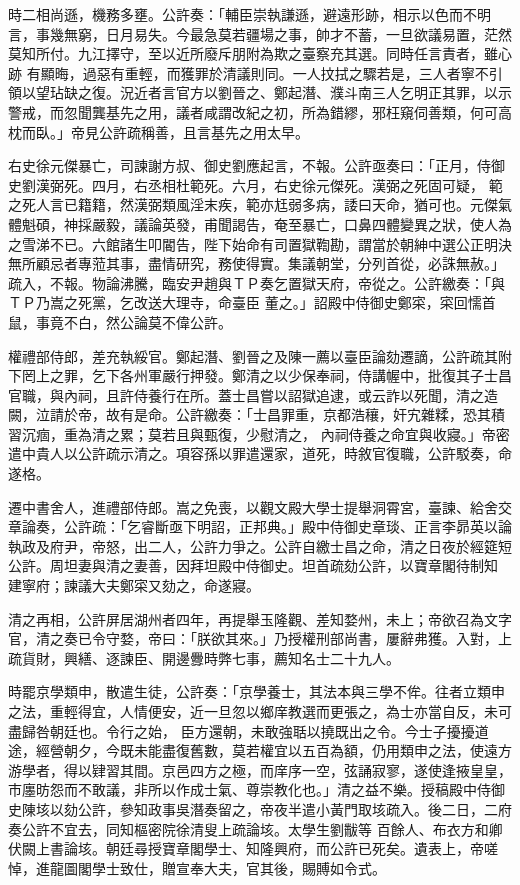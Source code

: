 \begin{pinyinscope}
 時二相尚遜，機務多壅。公許奏：「輔臣崇執謙遜，避遠形跡，相示以色而不明言，事幾無窮，日月易失。今最急莫若疆場之事，帥才不蓄，一旦欲議易置，茫然莫知所付。九江擇守，至以近所廢斥朋附為欺之臺察充其選。同時任言責者，雖心跡
 有顯晦，過惡有重輕，而獲罪於清議則同。一人抆拭之驟若是，三人者寧不引領以望玷缺之復。況近者言官方以劉晉之、鄭起潛、濮斗南三人乞明正其罪，以示警戒，而忽聞龔基先之用，議者咸謂改紀之初，所為錯繆，邪枉窺伺善類，何可高枕而臥。」帝見公許疏稱善，且言基先之用太早。



 右史徐元傑暴亡，司諫謝方叔、御史劉應起言，不報。公許亟奏曰：「正月，侍御史劉漢弼死。四月，右丞相杜範死。六月，右史徐元傑死。漢弼之死固可疑，
 範之死人言已籍籍，然漢弼類風淫末疾，範亦尪弱多病，諉曰天命，猶可也。元傑氣體魁碩，神採嚴毅，議論英發，甫聞謁告，奄至暴亡，口鼻四體變異之狀，使人為之雪涕不已。六館諸生叩閽告，陛下始命有司置獄鞫勘，謂當於朝紳中選公正明決無所顧忌者專蒞其事，盡情研究，務使得實。集議朝堂，分列首從，必誅無赦。」疏入，不報。物論沸騰，臨安尹趙與ＴＰ奏乞置獄天府，帝從之。公許繳奏：「與ＴＰ乃嵩之死黨，乞改送大理寺，命臺臣
 董之。」詔殿中侍御史鄭寀，寀回懦首鼠，事竟不白，然公論莫不偉公許。



 權禮部侍郎，差充執綏官。鄭起潛、劉晉之及陳一薦以臺臣論劾遷謫，公許疏其附下罔上之罪，乞下各州軍嚴行押發。鄭清之以少保奉祠，侍講幄中，批復其子士昌官職，與內祠，且許侍養行在所。蓋士昌嘗以詔獄追逮，或云詐以死聞，清之造闕，泣請於帝，故有是命。公許繳奏：「士昌罪重，京都浩穰，奸宄雜糅，恐其積習沉痼，重為清之累；莫若且與甄復，少慰清之，
 內祠侍養之命宜與收寢。」帝密遣中貴人以公許疏示清之。項容孫以罪遣還家，道死，時敘官復職，公許駁奏，命遂格。



 遷中書舍人，進禮部侍郎。嵩之免喪，以觀文殿大學士提舉洞霄宮，臺諫、給舍交章論奏，公許疏：「乞睿斷亟下明詔，正邦典。」殿中侍御史章琰、正言李昴英以論執政及府尹，帝怒，出二人，公許力爭之。公許自繳士昌之命，清之日夜於經筵短公許。周坦妻與清之妻善，因拜坦殿中侍御史。坦首疏劾公許，以寶章閣待制知
 建寧府；諫議大夫鄭寀又劾之，命遂寢。



 清之再相，公許屏居湖州者四年，再提舉玉隆觀、差知婺州，未上；帝欲召為文字官，清之奏已令守婺，帝曰：「朕欲其來。」乃授權刑部尚書，屢辭弗獲。入對，上疏貨財，興繕、逐諫臣、開邊釁時弊七事，薦知名士二十九人。



 時罷京學類申，散遣生徒，公許奏：「京學養士，其法本與三學不侔。往者立類申之法，重輕得宜，人情便安，近一旦忽以鄉庠教選而更張之，為士亦當自反，未可盡歸咎朝廷也。令行之始，
 臣方還朝，未敢強聒以撓既出之令。今士子擾擾道途，經營朝夕，今既未能盡復舊數，莫若權宜以五百為額，仍用類申之法，使遠方游學者，得以肄習其間。京邑四方之極，而庠序一空，弦誦寂寥，遂使逢掖皇皇，市廛昉怨而不敢議，非所以作成士氣、尊崇教化也。」清之益不樂。授稿殿中侍御史陳垓以劾公許，參知政事吳潛奏留之，帝夜半遣小黃門取垓疏入。後二日，二府奏公許不宜去，同知樞密院徐清叟上疏論垓。太學生劉黻等
 百餘人、布衣方和卿伏闕上書論垓。朝廷尋授寶章閣學士、知隆興府，而公許已死矣。遺表上，帝嗟悼，進龍圖閣學士致仕，贈宣奉大夫，官其後，賜賻如令式。




\end{pinyinscope}
